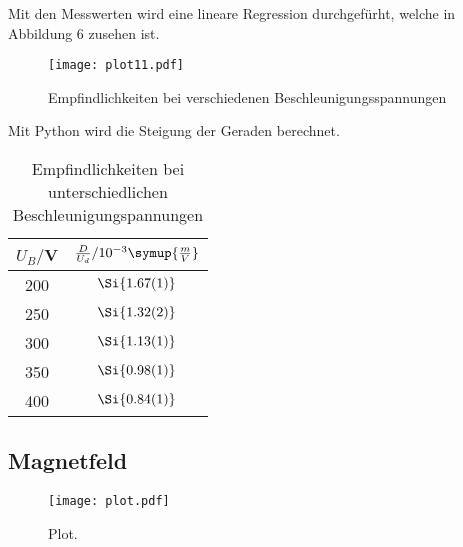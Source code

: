 Mit den Messwerten wird eine lineare Regression durchgefürht, welche in Abbildung 6 zusehen ist.

\begin{figure}
  \centering
  \texttt{[image: plot11.pdf]}
  \caption{Empfindlichkeiten bei verschiedenen Beschleunigungsspannungen}
  \label{fig:plot}
\end{figure}

Mit Python wird die Steigung der Geraden berechnet. \\

\begin{table}[H]
  \centering
  \caption{Empfindlichkeiten bei unterschiedlichen Beschleunigungspannungen}
  \label{tab:Spannungsamplitude}
  \begin{tabular}{c c}
    \toprule
    $U_B/$V & $\frac{D}{U_d} / 10^{-3}\symup{\frac{m}{V}}$ \\
    \midrule
    200 & $\Si{1.67(1)}$ \\
    250 & $\Si{1.32(2)}$ \\
    300 & $\Si{1.13(1)}$ \\
    350 & $\Si{0.98(1)}$ \\
    400 & $\Si{0.84(1)}$ \\
    \bottomrule
  \end{tabular}
\end{table}



\subsection{Magnetfeld}

\begin{figure}
  \centering
  \texttt{[image: plot.pdf]}
  \caption{Plot.}
  \label{fig:plot}
\end{figure}
